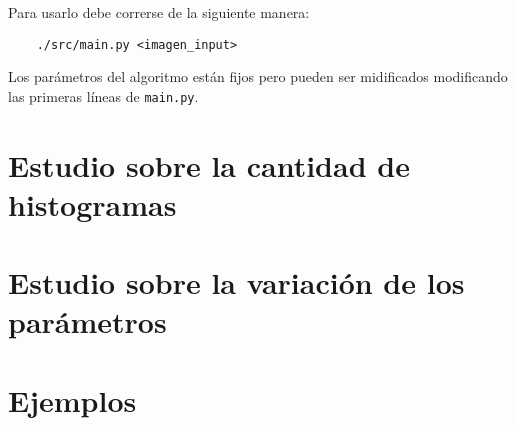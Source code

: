 \documentclass[11pt, spanish]{article}
\begin{document}
Para usarlo debe correrse de la siguiente manera:

\begin{verbatim}
    ./src/main.py <imagen_input>
\end{verbatim}

Los parámetros del algoritmo están fijos pero pueden ser midificados modificando las primeras líneas de
\texttt{main.py}.

\newpage

\section{Estudio sobre la cantidad de histogramas}

\newpage

\section{Estudio sobre la variación de los parámetros}

\newpage

\section{Ejemplos}

\end{document}
